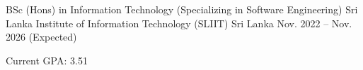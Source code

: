 

\begin{cventries}

  \cventry
    {BSc (Hons) in Information Technology (Specializing in Software Engineering)} %
    {Sri Lanka Institute of Information Technology (SLIIT)} %
    {Sri Lanka} %
    {Nov. 2022 -- Nov. 2026 (Expected)} %
    {
      \begin{cvitems} %
        \item {Current GPA: 3.51}
      \end{cvitems}
    }

\end{cventries}
